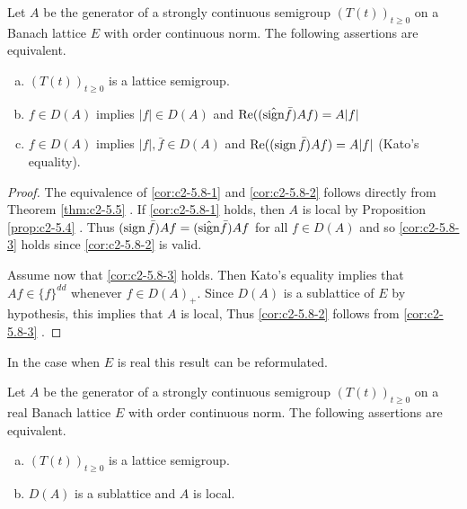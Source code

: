 \begin{corollary}\label{cor:c2-5.8}
Let $A$ be the generator of a strongly continuous semigroup $(T(t))_{t \geq 0}$ on a Banach lattice $E$ with order continuous norm. 
The following assertions are equivalent.
\begin{enumerate}[(a)]
\item \label{cor:c2-5.8-1}
$(T(t))_{t \geq 0}$ is a lattice semigroup.
\item \label{cor:c2-5.8-2}
$f \in D(A)$ implies $|f| \in D(A)$ and $\mathop{}\!\mathrm{Re}((\hat{\operatorname{sign}}  \bar{f})Af) = A|f|$ 
\item \label{cor:c2-5.8-3}
$f \in D(A)$ implies $|f|,\bar{f} \in D(A)$ and $\mathop{}\!\mathrm{Re}((\operatorname{sign}  \bar{f})Af) = A|f|$ 
(Kato's equality).
\end{enumerate}
\end{corollary}

\begin{proof}
The equivalence of \ref{cor:c2-5.8-1}   and \ref{cor:c2-5.8-2}   follows directly from Theorem \ref{thm:c2-5.5}  . 
If \ref{cor:c2-5.8-1}   holds, then $A$ is local by  Proposition \ref{prop:c2-5.4}  .
Thus $(\operatorname{sign}  \bar{f})Af = (\hat{\operatorname{sign}}  \bar{f})Af$ for all $f \in D(A)$ and so \ref{cor:c2-5.8-3}   holds since \ref{cor:c2-5.8-2}   is valid.

Assume now that \ref{cor:c2-5.8-3}   holds. 
Then Kato's equality implies that $Af \in \{f\}^{dd}$ whenever $f \in D(A)_{+}$. 
Since $D(A)$ is a sublattice of $E$ by hypothesis, this implies that $A$ is local, Thus \ref{cor:c2-5.8-2}   follows from \ref{cor:c2-5.8-3}   .
\end{proof}

In the case when $E$ is real this result can be reformulated.

\begin{corollary}\label{cor:c2-5.9}
Let $A$ be the generator of a strongly continuous semigroup $(T(t))_{t \geq 0}$ on a real Banach lattice $E$ with order continuous norm. 
The following assertions are equivalent.
\begin{enumerate}[(a)]
\item \label{cor:c2-5.9-1}
$(T(t))_{t \geq 0}$ is a lattice semigroup.
\item \label{cor:c2-5.9-2}
$D(A)$ is a sublattice and $A$ is local.
\end{enumerate}
\end{corollary}

